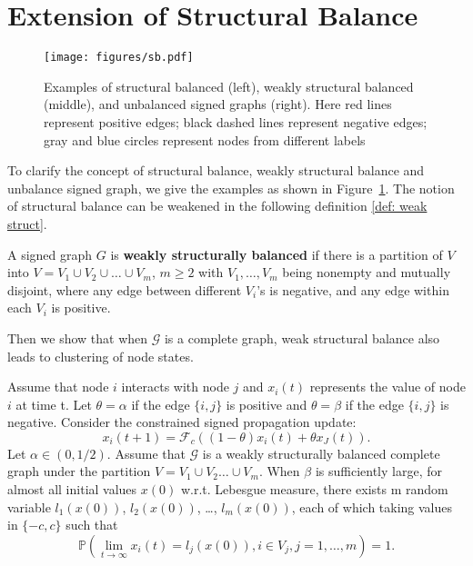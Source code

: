 \section{Extension of Structural Balance}
\label{app:weak-balance}
\begin{figure}
    \centering
    \texttt{[image: figures/sb.pdf]}
    \caption{Examples of structural balanced (left), weakly structural balanced (middle), and unbalanced signed graphs (right). Here red lines represent positive edges; black dashed lines represent negative edges; gray and blue circles represent nodes from different labels}
    \label{fig: sb}
\end{figure}
To clarify the concept of structural balance, weakly structural balance and unbalance signed graph, we give the examples as shown in Figure~\ref{fig: sb}.
The notion of structural balance can be weakened in the following definition \ref{def: weak struct}.
\begin{definition}
    A signed graph \( G \) is \textbf{weakly structurally balanced} if there is a partition of \( V \) into \( V = V_1 \cup V_2 \cup \ldots \cup V_m \), \( m \geq 2 \) with \( V_1, \ldots, V_m \) being nonempty and mutually disjoint, where any edge between different \( V_i \)'s is negative, and any edge within each \( V_i \) is positive.
    \label{def: weak struct}
\end{definition}

Then we show that when $\mathcal{G}$ is a complete graph, weak structural balance also leads to clustering of node states.
\begin{theorem}
\label{thm: weak_repel_struct} 
Assume that node $i$ interacts with node $j$ and $x_i(t)$ represents the value of node $i$ at time t. 
Let $\theta=\alpha$ if the edge $\{i,j\}$ is positive and $\theta=\beta$ if the edge $\{i,j\}$ is negative.
Consider the constrained signed propagation update:
\begin{equation}
\label{eq: weak constrained repel dyn}
    x_i(t + 1) = \mathcal{F}_c((1-\theta) x_i(t)+\theta x_J(t)).
\end{equation}
Let \(\alpha \in (0,1/2)\). 
Assume that \(\mathcal{G}\) is a weakly structurally balanced complete graph under the partition \(V = V_1 \cup V_2 \dots \cup V_m\). 
When \(\beta\) is sufficiently large, for almost all initial values \(x(0)\) w.r.t. Lebesgue measure, there exists m random variable \(l_1(x(0))\), \(l_2(x(0))\), \dots, \(l_m(x(0))\), each of which taking values in \(\{-c,c\}\) such that
\begin{equation}
    \mathbb{P}\left(\lim_{t \to \infty} x_i(t) = l_j(x(0)), i \in V_j, j=1,\dots, m \right) = 1.
\end{equation}
\end{theorem}





